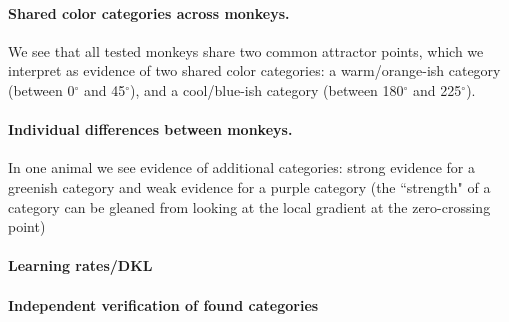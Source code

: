 \paragraph{Shared color categories across monkeys.}

We see that all tested monkeys share two common attractor points, which we interpret as evidence of two shared color categories: a warm/orange-ish category (between 0$^\circ$ and 45$^\circ$), and a cool/blue-ish category (between 180$^\circ$ and 225$^\circ$).

\paragraph{Individual differences between monkeys.}

In one animal we see evidence of additional categories: strong evidence for a greenish category and weak evidence for a purple category (the ``strength" of a category can be gleaned from looking at the local gradient at the zero-crossing point)



\paragraph{Learning rates/DKL}

\paragraph{Independent verification of found categories}



